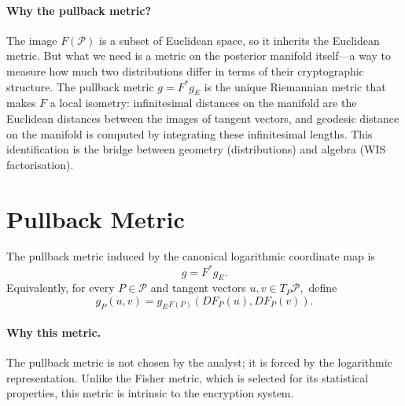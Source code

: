 \paragraph{Why the pullback metric?}
The image $F(\mathcal P)$ is a subset of Euclidean space, so it inherits the Euclidean metric.  But what we need is a metric on the posterior manifold itself---a way to measure how much two distributions differ in terms of their cryptographic structure.  The pullback metric $g=F^*g_E$ is the unique Riemannian metric that makes $F$ a local isometry: infinitesimal distances on the manifold are the Euclidean distances between the images of tangent vectors, and geodesic distance on the manifold is computed by integrating these infinitesimal lengths.  This identification is the bridge between geometry (distributions) and algebra (WIS factorisation).

\section{Pullback Metric}\label{ch:sec:pullback-metric}
\begin{definition}
\label{ch:def:7-2}
The pullback metric induced by the canonical logarithmic coordinate map is
\[
g
=
F^{*}g_E.
\]
Equivalently, for every
$P\in\mathcal P$
and tangent vectors
$u,v\in T_P\mathcal P,$
define
\[
g_P(u,v)
=
g_E{}_{F(P)}
\!\left(
DF_P(u),
DF_P(v)
\right).
\]
\end{definition}

\paragraph{Why this metric.}
The pullback metric is not chosen by the analyst; it is forced by the logarithmic representation.  Unlike the Fisher metric, which is selected for its statistical properties, this metric is intrinsic to the encryption system.

